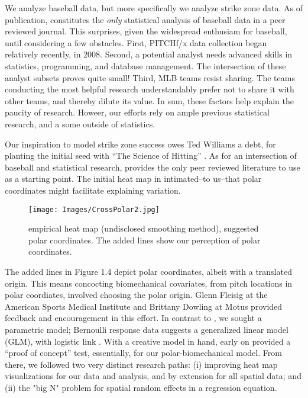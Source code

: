 We analyze baseball data, but more specifically we analyze strike zone data. As of publication, \cite{Cross2015} constitutes the {\it only} statistical analysis of baseball data in a peer reviewed journal. This surprises, given the widespread enthusiam for baseball, until considering a few obstacles. First, PITCHf/x\textsuperscript{\textregistered} data collection began relatively recently, in 2008. Second, a potential analyst needs advanced skills in statistics, programming, and database management. The intersection of these analyst subsets proves quite small!  Third, MLB teams resist sharing. The teams conducting the most helpful research understandably prefer not to share it with other teams, and thereby dilute its value. In sum, these factors help explain the paucity of research. Howeer, our efforts rely on ample previous statistical research, and a some outside of statistics.

Our inspiration to model strike zone success owes Ted Williams a debt, for planting the initial seed with ``The Science of Hitting'' \citep{Williams1971}. As for an intersection of baseball and statistical research, \cite{Cross2015} provides the only peer reviewed literature to use as a starting point. The initial heat map in \cite{Cross2015} intimated--to us--that polar coordinates might facilitate explaining variation. 
        \begin{figure}[H]
      	\centering
      	\texttt{[image: Images/CrossPolar2.jpg]} 
      	\caption{\cite{Cross2015} empirical heat map (undisclosed smoothing method), suggested polar coordinates. The added lines show our perception of polar coordinates.}
      	\end{figure}
The added lines in Figure 1.4 depict polar coordinates, albeit with a translated origin. This means concocting biomechanical covariates, from pitch locations in polar coordiates, involved choosing the polar origin. Glenn Fleisig at the American Sports Medical Institute \citep{Fleisig2002} and Brittany Dowling at Motus \citep{Dowling2016} provided feedback and encouragement in this effort. In contrast to \citep{Cross2015}, we sought a parametric model; Bernoulli response data suggests a generalized linear model (GLM), with logistic link \citep{Myers2012}. With a creative model in hand, early on \cite{Hosmer2013} provided a ``proof of concept'' test, essentially, for our polar-biomechanical model. From there, we followed two very distinct research paths: (i) improving heat map visualizations for our data and analysis, and by extension for all spatial data; and (ii) the "big N" problem for spatial random effects in a regression equation.

